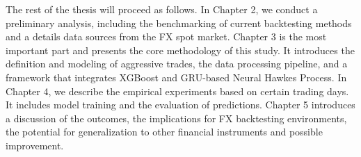 The rest of the thesis will proceed as follows. In Chapter 2, we conduct a preliminary analysis, including the benchmarking of current backtesting methods and a details data sources from the FX spot market. Chapter 3 is the most important part and presents the core methodology of this study. It introduces the definition and modeling of aggressive trades, the data processing pipeline, and a framework that integrates XGBoost and GRU-based Neural Hawkes Process. In Chapter 4, we describe the empirical experiments based on certain trading days. It includes model training and the evaluation of predictions. Chapter 5 introduces a discussion of the outcomes, the implications for FX backtesting environments, the potential for generalization to other financial instruments and possible improvement.